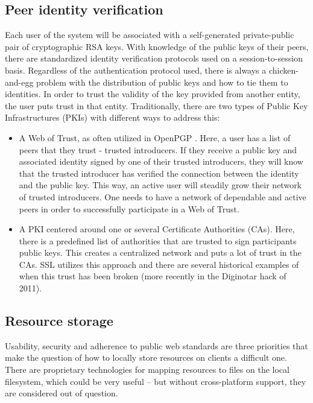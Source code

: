 \subsection{Peer identity verification}
Each user of the system will be associated with a self-generated private-public pair of cryptographic RSA keys. With knowledge of the public keys of their peers, there are standardized identity verification protocols used on a session-to-session basis. Regardless of the authentication protocol used, there is always a chicken-and-egg problem with the distribution of public keys and how to tie them to identities. In order to trust the validity of the key provided from another entity, the user puts trust in that entity. Traditionally, there are two types of Public Key Infrastructures (PKIs) with different ways to address this:

\begin{itemize}
  \item A Web of Trust, as often utilized in OpenPGP \cite{Maurer:1996}. Here, a user has a list of peers that they trust - trusted introducers. If they receive a public key and associated identity signed by one of their trusted introducers, they will know that the trusted introducer has verified the connection between the identity and the public key. This way, an active user will steadily grow their network of trusted introducers. One needs to have a network of dependable and active peers in order to successfully participate in a Web of Trust.
\item A PKI centered around one or several Certificate Authorities (CAs). Here, there is a predefined list of authorities that are trusted to sign participants public keys. This creates a centralized network and puts a lot of trust in the CAs. SSL utilizes this approach and there are several historical examples of when this trust has been broken (more recently in the Diginotar hack of 2011).
\end{itemize}

\subsection{Resource storage}
Usability, security and adherence to public web standards are three priorities that make the question of how to locally store resources on clients a difficult one. There are proprietary technologies for mapping resources to files on the local filesystem, which could be very useful – but without cross-platform support, they are considered out of question.

